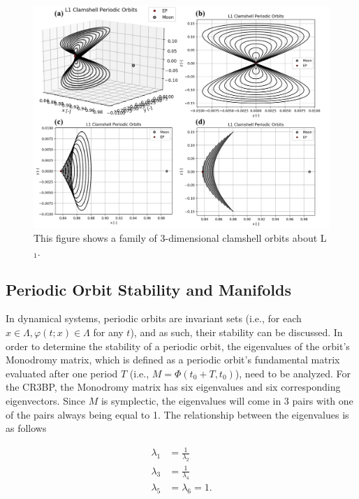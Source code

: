 \documentclass[11pt]{article} %
\begin{document}
\begin{figure}[H]
    \centering
    \includegraphics[width=\textwidth]{L1_clamshell_comb.png}
    \caption{This figure shows a family of 3-dimensional clamshell orbits about L$_1$.}
    \label{f:clamshell_po}
\end{figure}


\subsection{Periodic Orbit Stability and Manifolds}
In dynamical systems, periodic orbits are invariant sets (i.e., for each $x \in \Lambda, \varphi\left(t;x\right)\in\Lambda$ for any $t$), and as such, their stability can be discussed. In order to determine the stability of a periodic orbit, the eigenvalues of the orbit's Monodromy matrix, which is defined as a periodic orbit's fundamental matrix evaluated after one period $T$ (i.e., $M=\Phi\left(t_0+T,t_0\right)$), need to be analyzed. For the CR3BP, the Monodromy matrix has six eigenvalues and six corresponding eigenvectors. Since $M$ is symplectic, the eigenvalues will come in 3 pairs with one of the pairs always being equal to 1. The relationship between the eigenvalues is as follows

\begin{align}
	\lambda_1 &= \frac{1}{\lambda_2}\\
	\lambda_3 &= \frac{1}{\lambda_4}\\
	\lambda_5 &= \lambda_6 = 1.
\end{align}
\end{document}
